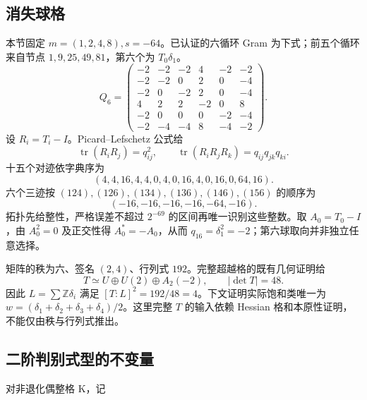 \documentclass[11pt,a4paper,oneside]{ctexart}
\theoremstyle{cnplain}
\theoremstyle{definition}
\theoremstyle{remark}
\newcommand{\Z}{\mathbb Z}
\numberwithin{equation}{section}
\begin{document}
\endgroup

\subsection*{消失球格}

\begingroup

本节固定 $m=(1,2,4,8),s=-64$。已认证的六循环 Gram 为下式；前五个循环来自节点 $1,9,25,49,81$，第六个为 $T_0\delta_1$。
\begin{equation}Q_6=\begin{pmatrix}
-2&-2&-2&4&-2&-2\\-2&-2&0&2&0&-4\\-2&0&-2&2&0&-4\\
4&2&2&-2&0&8\\-2&0&0&0&-2&-4\\-2&-4&-4&8&-4&-2
\end{pmatrix}.\label{eq:gram}\end{equation}
设 $R_i=T_i-I$。Picard--Lefschetz 公式给
\begin{equation}\operatorname{tr}(R_iR_j)=q_{ij}^2,\qquad
\operatorname{tr}(R_iR_jR_k)=q_{ij}q_{jk}q_{ki}.\end{equation}
十五个对迹依字典序为
\begin{equation}(4,4,16,4,4,0,4,0,16,4,0,16,0,64,16).\end{equation}
六个三迹按 $(124),(126),(134),(136),(146),(156)$ 的顺序为
\begin{equation}(-16,-16,-16,-16,-64,-16).\end{equation}
拓扑先给整性，严格误差不超过 $2^{-69}$ 的区间再唯一识别这些整数。取 $A_0=T_0-I$，由 $A_0^2=0$ 及正交性得 $A_0^*=-A_0$，从而 $q_{16}=\delta_1^2=-2$；第六球取向并非独立任意选择。

矩阵的秩为六、签名 $(2,4)$、行列式 $192$。完整超越格的既有几何证明给
\begin{equation}T\simeq U\oplus U(2)\oplus A_2(-2),\qquad |\det T|=48.\end{equation}
因此 $L=\sum\Z\delta_i$ 满足 $[T:L]^2=192/48=4$。下文证明实际饱和类唯一为 $w=(\delta_1+\delta_2+\delta_3+\delta_4)/2$。这里完整 $T$ 的输入依赖 Hessian 格和本原性证明，不能仅由秩与行列式推出\cite{dvgeemen}。


\subsection{二阶判别式型的不变量}\label{sec:lattice:2}

对非退化偶整格 K，记
\end{document}
